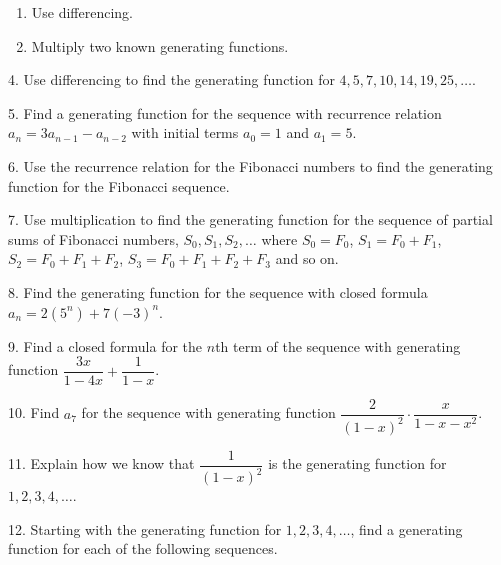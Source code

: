 \documentclass[10pt,]{book}
\theoremstyle{plain}
\theoremstyle{definition}
\theoremstyle{definition}
\theoremstyle{definition}
\numberwithin{equation}{chapter}
\begin{document}
\begin{exerciselist}
\begin{enumerate}[label=(\alph*)]
%
\item\hypertarget{li-1343}{}
Use differencing.
%
\item\hypertarget{li-1344}{}
Multiply two known generating functions.
%
\end{enumerate}
\par\smallskip
\item[4.]\hypertarget{exercise-325}{}
Use differencing to find the generating function for \(4, 5, 7, 10, 14, 19, 25, \ldots\).
%
\par\smallskip
\item[5.]\hypertarget{exercise-326}{}
Find a generating function for the sequence with recurrence relation \(a_n = 3a_{n-1} - a_{n-2}\) with initial terms \(a_0 = 1\) and \(a_1 = 5\).
%
\par\smallskip
\item[6.]\hypertarget{exercise-327}{}
Use the recurrence relation for the Fibonacci numbers to find the generating function for the Fibonacci sequence.
%
\par\smallskip
\item[7.]\hypertarget{exercise-328}{}
Use multiplication to find the generating function for the sequence of partial sums of Fibonacci numbers, \(S_0, S_1, S_2, \ldots\) where \(S_0 = F_0\), \(S_1 = F_0 + F_1\), \(S_2 = F_0 + F_1 + F_2\), \(S_3 = F_0 + F_1 + F_2 + F_3\) and so on.
%
\par\smallskip
\item[8.]\hypertarget{exercise-329}{}
Find the generating function for the sequence with closed formula \(a_n = 2(5^n) + 7(-3)^n\).
%
\par\smallskip
\item[9.]\hypertarget{exercise-330}{}
Find a closed formula for the \(n\)th term of the sequence with generating function \(\dfrac{3x}{1-4x} + \dfrac{1}{1-x}\).
%
\par\smallskip
\item[10.]\hypertarget{exercise-331}{}
Find \(a_7\) for the sequence with generating function \(\dfrac{2}{(1-x)^2}\cdot\dfrac{x}{1-x-x^2}\).
%
\par\smallskip
\item[11.]\hypertarget{exercise-332}{}
Explain how we know that \(\dfrac{1}{(1-x)^2}\) is the generating function for \(1, 2, 3, 4, \ldots\).
%
\par\smallskip
\item[12.]\hypertarget{exercise-333}{}
Starting with the generating function for \(1,2,3,4, \ldots\), find a generating function for each of the following sequences.

\end{exerciselist}
\end{document}
